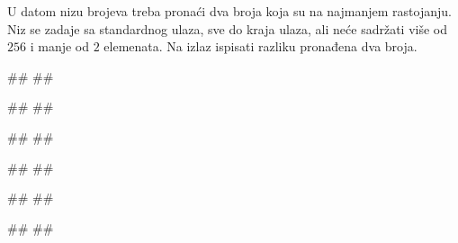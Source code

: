 \begin{Answer}[ref=3_13]
\end{Answer}
\begin{Exercise}[label=3_14]
  U datom nizu brojeva treba pronaći dva broja koja su na najmanjem
  rastojanju. Niz se zadaje sa standardnog ulaza, sve do kraja ulaza,
  ali neće sadržati više od $256$ i manje od $2$ elemenata. Na izlaz
  ispisati razliku pronađena dva broja. 

\begin{minitest}
\begin{test}{1}
#\naslovUlaz#
##

#\naslovIzlaz#
##
\end{test}
\end{minitest}
\begin{minitest}
\begin{test}{2}
#\naslovUlaz#
##
  
#\naslovIzlaz#
##
\end{test}
\end{minitest}
\begin{minitest}
\begin{test}{3}
#\naslovUlaz#
##

#\naslovIzlaz#
##
\end{test}
\end{minitest}
  
\end{Exercise}

